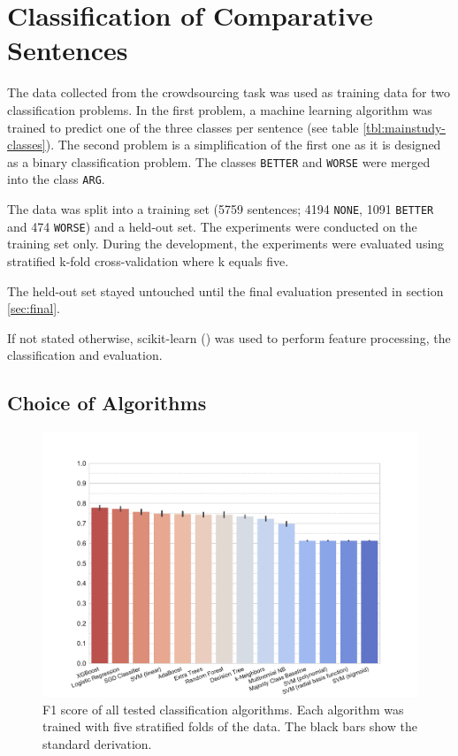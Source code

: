 \chapter{Classification of Comparative Sentences}
The data collected from the crowdsourcing task was used as training data for two classification problems. In the first problem, a machine learning algorithm was trained to predict one of the three classes per sentence (see table \ref{tbl:mainstudy-classes}). The second problem is a simplification of the first one as it is designed as a binary classification problem. The classes \texttt{BETTER} and \texttt{WORSE} were merged into the class \texttt{ARG}.

The data was split into a training set (5759 sentences; 4194 \texttt{NONE}, 1091 \texttt{BETTER} and 474 \texttt{WORSE}) and a held-out set.
The experiments were conducted on the training set only. During the development, the experiments were evaluated using stratified k-fold cross-validation where k equals five. 

The held-out set stayed untouched until the final evaluation presented in section \ref{sec:final}.

If not stated otherwise, scikit-learn (\cite{scikit-learn}) was used to perform feature processing, the classification and evaluation.

\section{Choice of Algorithms}

\begin{figure}[htb]
\centering
\caption{F1 score of all tested classification algorithms. Each algorithm was trained with five stratified folds of the data. The black bars show the standard derivation.}
\label{tbl:algo}
\includegraphics[width=0.8\linewidth]{images/classifier}
\end{figure}

